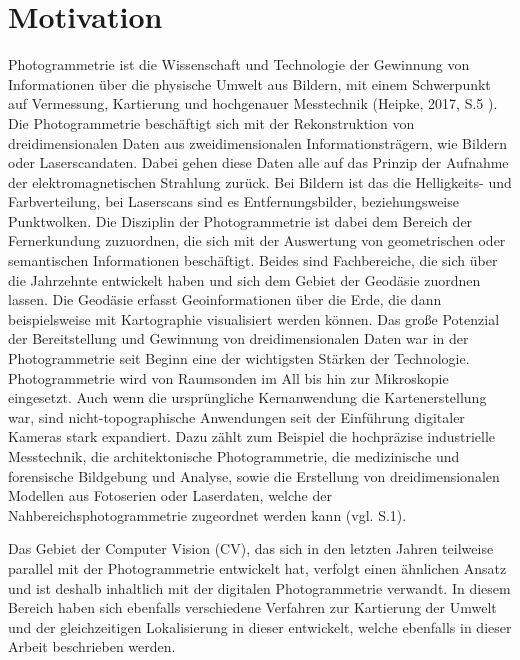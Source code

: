 \chapter{Motivation}

Photogrammetrie ist \glqq die Wissenschaft und Technologie der Gewinnung von Informationen
über die physische Umwelt aus Bildern, mit einem Schwerpunkt auf Vermessung,
Kartierung und hochgenauer Messtechnik\grqq{} (Heipke, 2017, S.5 \cite{photo}).  Die Photogrammetrie beschäftigt sich  mit der Rekonstruktion von dreidimensionalen Daten aus zweidimensionalen Informationsträgern, wie Bildern oder Laserscandaten. Dabei gehen diese Daten alle auf das Prinzip der Aufnahme der elektromagnetischen Strahlung zurück. Bei Bildern ist das die Helligkeits- und Farbverteilung, bei Laserscans sind es Entfernungsbilder, beziehungsweise Punktwolken. Die Disziplin der Photogrammetrie ist dabei dem Bereich der Fernerkundung zuzuordnen, die sich mit der Auswertung von geometrischen oder semantischen Informationen beschäftigt. Beides sind Fachbereiche, die sich über die Jahrzehnte entwickelt haben und sich dem Gebiet der Geodäsie zuordnen lassen. Die Geodäsie erfasst Geoinformationen über die Erde, die dann beispielsweise mit Kartographie visualisiert werden können. Das große Potenzial der Bereitstellung und Gewinnung von dreidimensionalen Daten war in der Photogrammetrie seit Beginn eine der wichtigsten Stärken der Technologie. Photogrammetrie wird von Raumsonden im All bis hin zur Mikroskopie eingesetzt. Auch wenn die ursprüngliche Kernanwendung die Kartenerstellung war, sind nicht-topographische Anwendungen seit der Einführung digitaler Kameras stark expandiert. Dazu zählt zum Beispiel die hochpräzise industrielle Messtechnik, die architektonische Photogrammetrie, die medizinische und forensische Bildgebung und Analyse, sowie die Erstellung von dreidimensionalen Modellen aus Fotoserien oder Laserdaten, welche der Nahbereichsphotogrammetrie zugeordnet werden kann (vgl. \cite{state_of_art} S.1).


Das Gebiet der Computer Vision (CV), das sich in den letzten Jahren teilweise parallel mit der Photogrammetrie entwickelt hat, verfolgt einen ähnlichen Ansatz und ist deshalb inhaltlich mit der digitalen Photogrammetrie verwandt. In diesem Bereich haben sich ebenfalls verschiedene Verfahren zur Kartierung der Umwelt und der gleichzeitigen Lokalisierung in dieser entwickelt, welche ebenfalls in dieser Arbeit beschrieben werden.  \\ \\

